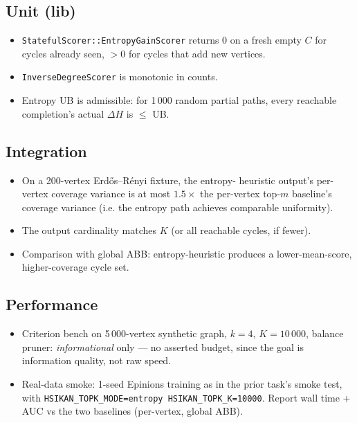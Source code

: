 \documentclass[a4paper,11pt]{article}
\begin{document}
\subsection*{Unit (lib)}

\begin{itemize}
  \item \texttt{StatefulScorer::EntropyGainScorer} returns 0 on a
    fresh empty $C$ for cycles already seen, $> 0$ for cycles that
    add new vertices.
  \item \texttt{InverseDegreeScorer} is monotonic in counts.
  \item Entropy UB is admissible: for 1\,000 random partial paths,
    every reachable completion's actual $\Delta H$ is $\le$ UB.
\end{itemize}

\subsection*{Integration}

\begin{itemize}
  \item On a 200-vertex Erd\H{o}s--R\'enyi fixture, the entropy-
    heuristic output's per-vertex coverage variance is at most
    $1.5\times$ the per-vertex top-$m$ baseline's coverage variance
    (i.e. the entropy path achieves comparable uniformity).
  \item The output cardinality matches $K$ (or all reachable
    cycles, if fewer).
  \item Comparison with global ABB: entropy-heuristic produces a
    lower-mean-score, higher-coverage cycle set.
\end{itemize}

\subsection*{Performance}

\begin{itemize}
  \item Criterion bench on 5\,000-vertex synthetic graph,
    $k{=}4$, $K{=}10\,000$, balance pruner: \emph{informational}
    only — no asserted budget, since the goal is information
    quality, not raw speed.
  \item Real-data smoke: 1-seed Epinions training as in the prior
    task's smoke test, with \texttt{HSIKAN\_TOPK\_MODE=entropy
    HSIKAN\_TOPK\_K=10000}.  Report wall time + AUC vs the two
    baselines (per-vertex, global ABB).
\end{itemize}
\end{document}
